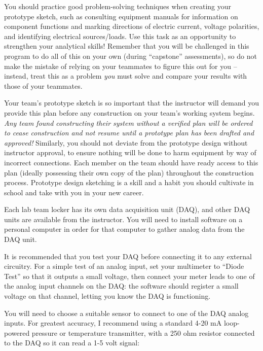 \begin{itemize}
You should practice good problem-solving techniques when creating your prototype sketch, such as consulting equipment manuals for information on component functions and marking directions of electric current, voltage polarities, and identifying electrical sources/loads.  Use this task as an opportunity to strengthen your analytical skills!  Remember that you will be challenged in this program to do all of this on your own (during ``capstone'' assessments), so do not make the mistake of relying on your teammates to figure this out for you -- instead, treat this as a problem {\it you} must solve and compare your results with those of your teammates.

Your team's prototype sketch is so important that the instructor will demand you provide this plan before any construction on your team's working system begins.  {\it Any team found constructing their system without a verified plan will be ordered to cease construction and not resume until a prototype plan has been drafted and approved!}  Similarly, you should not deviate from the prototype design without instructor approval, to ensure nothing will be done to harm equipment by way of incorrect connections.  Each member on the team should have ready access to this plan (ideally possessing their own copy of the plan) throughout the construction process.  Prototype design sketching is a skill and a habit you should cultivate in school and take with you in your new career.

\vskip 10pt

Each lab team locker has its own data acquisition unit (DAQ), and other DAQ units are available from the instructor.  You will need to install software on a personal computer in order for that computer to gather analog data from the DAQ unit.

It is recommended that you test your DAQ before connecting it to any external circuitry.  For a simple test of an analog input, set your multimeter to ``Diode Test'' so that it outputs a small voltage, then connect your meter leads to one of the analog input channels on the DAQ: the software should register a small voltage on that channel, letting you know the DAQ is functioning.

\vskip 10pt

You will need to choose a suitable sensor to connect to one of the DAQ analog inputs.  For greatest accuracy, I recommend using a standard 4-20 mA loop-powered pressure or temperature transmitter, with a 250 ohm resistor connected to the DAQ so it can read a 1-5 volt signal:


\end{itemize}
